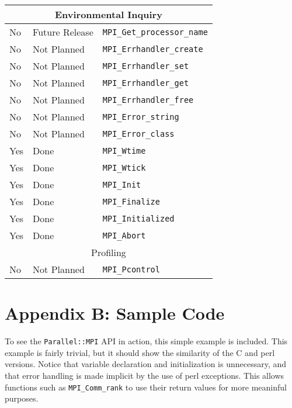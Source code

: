 \documentclass{report}
\begin{document}
\begin{tabular}{|l|l|l|}
\hline
\multicolumn{3}{|c|}{ Environmental Inquiry } \\ \hline

No             & Future Release     & \verb|MPI_Get_processor_name| \\ \hline
No             & Not Planned        & \verb|MPI_Errhandler_create| \\ \hline
No             & Not Planned        & \verb|MPI_Errhandler_set| \\ \hline
No             & Not Planned        & \verb|MPI_Errhandler_get| \\ \hline
No             & Not Planned        & \verb|MPI_Errhandler_free| \\ \hline
No             & Not Planned        & \verb|MPI_Error_string| \\ \hline
No             & Not Planned        & \verb|MPI_Error_class| \\ \hline
Yes            & Done               & \verb|MPI_Wtime| \\ \hline
Yes            & Done               & \verb|MPI_Wtick| \\ \hline
Yes            & Done               & \verb|MPI_Init| \\ \hline
Yes            & Done               & \verb|MPI_Finalize| \\ \hline
Yes            & Done               & \verb|MPI_Initialized| \\ \hline
Yes            & Done               & \verb|MPI_Abort| \\ \hline

\hline
\multicolumn{3}{|c|}{ Profiling } \\ \hline

No             & Not Planned        & \verb|MPI_Pcontrol| \\ \hline

\end{tabular}

\chapter*{Appendix B: Sample Code}

To see the \verb|Parallel::MPI| API in action, this simple example is
included.  This example is fairly trivial, but it should show the
similarity of the C and perl versions.   Notice that variable
declaration and initialization is unnecessary, and that error handling 
is made implicit by the use of perl exceptions.  This allows functions 
such as \verb|MPI_Comm_rank| to use their return values for more
meaninful purposes.
\end{document}
